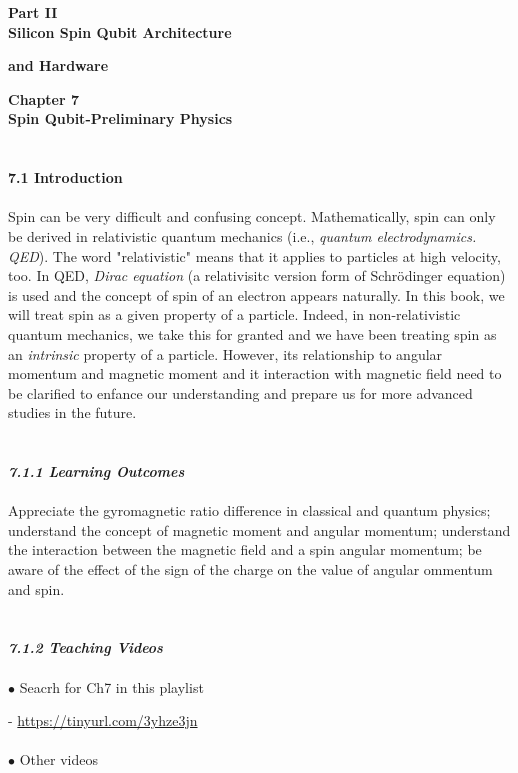 \documentclass{article}
\newcommand{\bfit}[1]{\textit{\textbf{#1}}}
\begin{document}
\hfill \textbf{\Large Part II}\\

\hfill \textbf{\Large Silicon Spin Qubit Architecture}

\hfill \textbf{\Large and Hardware}

\newpage
\textbf{\Large
Chapter 7\\
Spin Qubit-Preliminary Physics}\\\\\\
\textbf{\large 7.1 Introduction}\\\\
Spin can be very difficult and confusing concept. Mathematically, spin can 
only be derived in relativistic quantum mechanics (i.e., \textit{quantum electrodynamics. QED}).
The word "relativistic" means that it applies to particles at high velocity, too.
In QED, \textit{Dirac equation} (a relativisitc version form of Schr\"{o}dinger equation)
is used and the concept of spin of an electron appears naturally. In this book,
we will treat spin as a given property of a particle. Indeed, in non-relativistic
quantum mechanics, we take this for granted and we have been treating spin as an
\textit{intrinsic} property of a particle. However, its relationship to angular momentum and magnetic
moment and it interaction with magnetic field need to be clarified to enfance our understanding
and prepare us for more advanced studies in the future.\\\\\\
\bfit{\large 7.1.1 Learning Outcomes}\\\\
Appreciate the gyromagnetic ratio difference in classical and quantum physics;
understand the concept of magnetic moment and angular momentum; understand
the interaction between the magnetic field and a spin angular momentum; be aware
of the effect of the sign of the charge on the value of angular ommentum and spin.\\\\\\
\bfit{\large 7.1.2 Teaching Videos}\\\\

$\bullet$ Seacrh for Ch7 in this playlist

- \url{https://tinyurl.com/3yhze3jn}
\\\\
$\bullet$ Other videos
\end{document}

